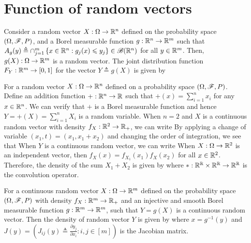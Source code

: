 \documentclass[letterpaper,10pt,english]{article}
\begin{document}
\section{Function of random vectors}
\begin{prop}
Consider a random vector $X: \Omega \to \mathbb{R}^n$ defined on the probability space $(\Omega, \mathscr{F}, P)$, 
and a Borel measurable function $g: \mathbb{R}^n \to \mathbb{R}^m$ such that $A_g(y) \triangleq \cap_{j=1}^m\left\{x \in \mathbb{R}^n: g_j(x) \leqslant y_j\right\} \in \mathscr{B}(\mathbb{R}^n)$ for all $y \in \mathbb{R}^m$. 
Then, $g(X): \Omega \to \mathbb{R}^m$ is a random vector. 
The joint distribution function $F_Y: \mathbb{R}^m \to [0,1]$ for the vector $Y\triangleq g(X)$ is given by 
\end{prop}
\begin{shaded}
\begin{exmp}
For a random vector $X: \Omega \to \mathbb{R}^n$ defined on a probability space $(\Omega, \mathscr{F}, P)$. 
Define an addition function $+: \mathbb{R}^n \to \mathbb{R}$ such that $+(x) = \sum_{i=1}^nx_i$ for any $x \in \mathbb{R}^n$. 
We can verify that $+$ is a Borel measurable function and hence $Y = +(X) = \sum_{i=1}^nX_i$ is a random variable. 
When $n=2$ and $X$ is a continuous random vector with density $f_X: \mathbb{R}^2 \to \mathbb{R}_+$, we can write 
By applying a change of variable $(x_1, t)= (x_1, x_1 + x_2)$ and changing the order of integration, 
we see that 
When $Y$ is a continuous random vector, we can write 
When $X: \Omega \to \mathbb{R}^2$ is an independent vector, then $f_X(x) = f_{X_1}(x_1)f_X(x_2)$ for all $x\in\mathbb{R}^2$. 
Therefore, the density of the sum $X_1+X_2$ is given by  
where $\ast: \mathbb{R}^{\mathbb{R}} \times \mathbb{R}^{\mathbb{R}} \to \mathbb{R}^{\mathbb{R}}$ is the convolution operator. 
\end{exmp}
\end{shaded}
\begin{thm}
For a continuous random vector $X:\Omega \to \mathbb{R}^m$ defined on the probability space $(\Omega, \mathscr{F}, P)$ with density $f_X: \mathbb{R}^m \to \mathbb{R}_+$ and an injective and smooth Borel measurable function $g: \mathbb{R}^m \to \mathbb{R}^m$, 
such that $Y=g(X)$ is a continuous random vector. 
Then the density of random vector $Y$ is given by 
where $x=g^{-1}(y)$ and $J(y)= (J_{ij}(y) \triangleq \frac{\partial y_j}{\partial x_i}: i,j\in [m])$ is the Jacobian matrix.  
\end{thm} 
\end{document}
